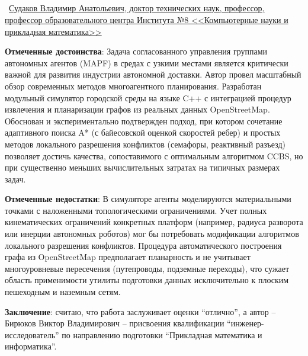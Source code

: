 \documentclass[fontsize=12pt, master]{diploma}
\makeatletter
\renewcommand{\makeReviewerLine}{
    \textbf{\@reviewerType}\ \uline{Судаков Владимир Анатольевич, доктор технических наук, профессор, \hfill}\\
    \uline{профессор образовательного центра Института №8 <<Компьютерные науки и прикладная математика>> \hfill}
}
\renewcommand{\fillReviewHeader}{
    \makeHeader

    \begin{center}
        \begingroup
        \bfseries\fontsize{18pt}{20pt}\selectfont
        \MakeUppercase{\@reviewTitle}
        \endgroup\\
        \begingroup
        \bfseries\fontsize{14pt}{16pt}\selectfont
        \MakeUppercase{\@reviewSupTitle}
        \endgroup
    \end{center}

    \vspace{-0.2cm}

    \SetSinglespace{1.2}
    \singlespacing

    \makeStudentLine\\
    \makeAffiliations\\
    \makeThemeLine\\
    \makeReviewerLine
}
\makeatother
\begin{document}
\fillReviewHeader

\vspace{-0.4cm}

\begingroup
{}
\singlespacing
\textbf{Отмеченные достоинства}: Задача согласованного управления группами автономных агентов (MAPF) 
в средах с узкими местами является критически важной для развития индустрии автономной доставки. 
Автор провел масштабный обзор современных методов многоагентного планирования. Разработан модульный 
симулятор городской среды на языке C++ с интеграцией процедур извлечения и планаризации графов из 
реальных данных OpenStreetMap. Обоснован и экспериментально подтвержден подход, при котором сочетание 
адаптивного поиска A* (с байесовской оценкой скоростей ребер) и простых методов локального разрешения 
конфликтов (семафоры, реактивный разъезд) позволяет достичь качества, сопоставимого с оптимальным 
алгоритмом CCBS, но при существенно меньших вычислительных затратах на типичных размерах задач.

\textbf{Отмеченные недостатки}: В симуляторе агенты моделируются материальными точками с наложенными 
топологическими ограничениями. Учет полных кинематических ограничений конкретных платформ 
(например, радиуса разворота или инерции автономных роботов) мог бы потребовать модификации алгоритмов 
локального разрешения конфликтов. Процедура автоматического построения графа из OpenStreetMap предполагает 
планарность и не учитывает многоуровневые пересечения (путепроводы, подземные переходы), 
что сужает область применимости утилиты подготовки данных исключительно к плоским пешеходным и наземным сетям.

\makeSimilarityLine

\textbf{Заключение}: считаю, что работа заслуживает оценки \enquote{отлично}, 
а автор – Бирюков Виктор Владимирович – присвоения квалификации \enquote{инженер-исследователь} 
по направлению подготовки \enquote{Прикладная математика и информатика}.

\vfill

\makeReviewSignature
\endgroup
\end{document}
